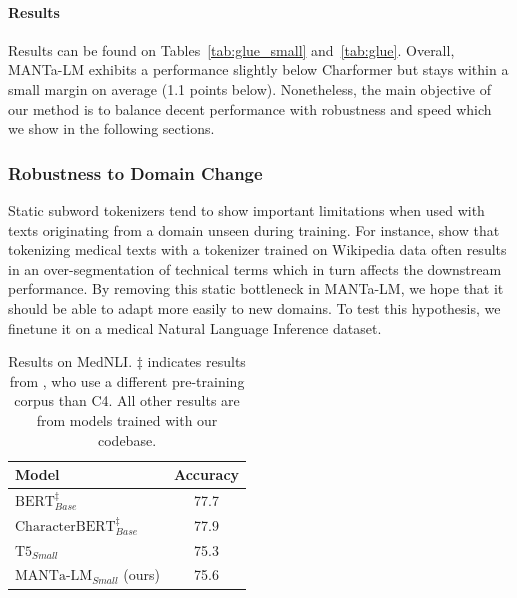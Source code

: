 \paragraph{Results} Results can be found on Tables~\ref{tab:glue_small} and~\ref{tab:glue}. Overall, MANTa-LM exhibits a performance slightly below Charformer but stays within a small margin on average (1.1 points below). Nonetheless, the main objective of our method is to balance decent performance with robustness and speed which we show in the following sections.



\subsubsection{Robustness to Domain Change}
Static subword tokenizers tend to show important limitations when used with texts originating from a domain unseen during training. For instance, \citet{el-boukkouri-etal-2020-characterbert} show that tokenizing medical texts with a tokenizer trained on Wikipedia data often results in an over-segmentation of technical terms which in turn affects the downstream performance. By removing this static bottleneck in MANTa-LM, we hope that it should be able to adapt more easily to new domains. To test this hypothesis, we finetune it on a medical Natural Language Inference dataset.

\begin{table}[t]
\centering\small
\begin{tabular}{lc}
\toprule
Model                                   & Accuracy  \\ \midrule
$\text{BERT}_{Base}^\ddagger$           & 77.7      \\
$\text{CharacterBERT}_{Base}^\ddagger$  & 77.9      \\
$\text{T5}_{Small}$                     & 75.3      \\ 
$\text{MANTa-LM}_{Small}$ (ours)     & 75.6      \\\bottomrule
\end{tabular}
\caption{Results on MedNLI. $\ddagger$ indicates results from \citet{el-boukkouri-etal-2020-characterbert}, who use a different pre-training corpus than C4. All other results are from models trained with our codebase.}
\label{tab:mednli}
\end{table}

